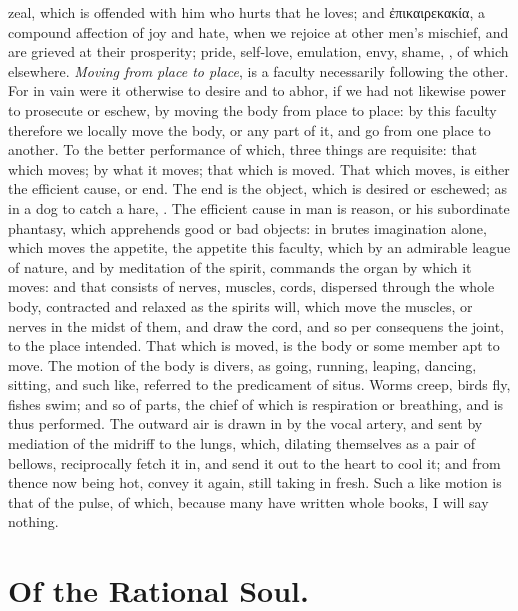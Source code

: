 {zeal, which is offended with him who hurts that he loves; and
ἐπικαιρεκακία, a compound affection of joy and hate, when we rejoice at
other men's mischief, and are grieved at their prosperity; pride,
self-love, emulation, envy, shame, \etc{}, of which elsewhere.
\emph{Moving from place to place}, is a faculty necessarily following the
other. For in vain were it otherwise to desire and to abhor, if we had
not likewise power to prosecute or eschew, by moving the body from
place to place: by this faculty therefore we locally move the body, or
any part of it, and go from one place to another. To the better
performance of which, three things are requisite: that which moves; by
what it moves; that which is moved. That which moves, is either the
efficient cause, or end. The end is the object, which is desired or
eschewed; as in a dog to catch a hare, \etc{}. The efficient cause in man
is reason, or his subordinate phantasy, which apprehends good or bad
objects: in brutes imagination alone, which moves the appetite, the
appetite this faculty, which by an admirable league of nature, and by
meditation of the spirit, commands the organ by which it moves: and
that consists of nerves, muscles, cords, dispersed through the whole
body, contracted and relaxed as the spirits will, which move the
muscles, or nerves in the midst of them, and draw the cord, and so
per consequens the joint, to the place intended. That which is moved,
is the body or some member apt to move. The motion of the body is
divers, as going, running, leaping, dancing, sitting, and such like,
referred to the predicament of situs. Worms creep, birds fly, fishes
swim; and so of parts, the chief of which is respiration or breathing,
and is thus performed. The outward air is drawn in by the vocal artery,
and sent by mediation of the midriff to the lungs, which, dilating
themselves as a pair of bellows, reciprocally fetch it in, and send it
out to the heart to cool it; and from thence now being hot, convey it
again, still taking in fresh. Such a like motion is that of the pulse,
of which, because many have written whole books, I will say nothing.

\section{Of the Rational Soul.}

}
